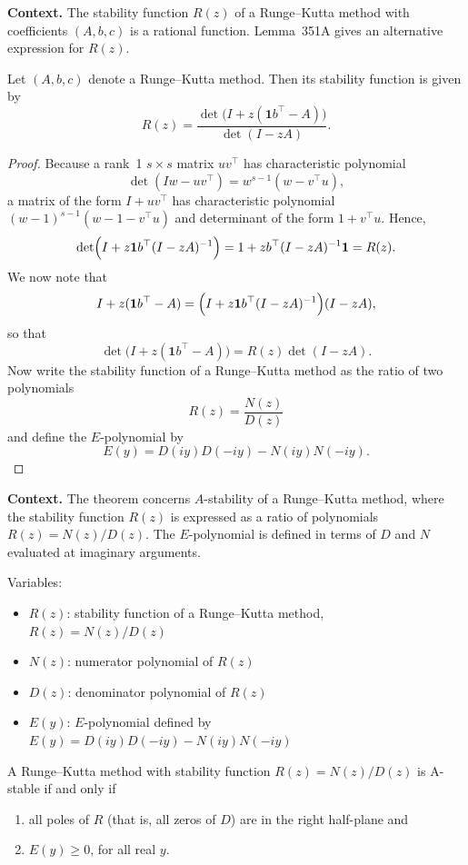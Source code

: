 \noindent\textbf{Context.}
The stability function \(R(z)\) of a Runge--Kutta method with coefficients \((A,b,c)\) is a rational function.  Lemma~351A gives an alternative expression for \(R(z)\).

\begin{lemma}

  \label{lem:351A}
Let $(A, b, c)$ denote a Runge--Kutta method. Then its stability function is given by
\[
R(z) = \frac{\det\bigl(I + z(\mathbf{1}b^{\top} - A)\bigr)}{\det(I - zA)}.
\]
\end{lemma}

\begin{proof}
Because a rank~1 $s \times s$ matrix $uv^{\top}$ has characteristic polynomial
\[
\det(I w - uv^{\top}) = w^{s-1}(w - v^{\top}u),
\]
a matrix of the form $I + uv^{\top}$ has characteristic polynomial $(w-1)^{s-1}(w-1-v^{\top}u)$ and determinant of the form $1+v^{\top}u$. Hence,
\[
\det\Bigl(I + z\mathbf{1}b^{\top}(I - zA)^{-1}\Bigr) = 1 + zb^{\top}(I - zA)^{-1}\mathbf{1} = R(z).
\]
We now note that
\[
I + z(\mathbf{1}b^{\top} - A) = \Bigl(I + z\mathbf{1}b^{\top}(I - zA)^{-1}\Bigr)(I - zA),
\]
so that
\[
\det\bigl(I + z(\mathbf{1}b^{\top} - A)\bigr) = R(z) \det(I - zA).
\]
Now write the stability function of a Runge--Kutta method as the ratio of two polynomials
\[
R(z) = \frac{N(z)}{D(z)}
\]
and define the $E$-polynomial by
\[
E(y) = D(iy)D(-iy) - N(iy)N(-iy).
\]
\end{proof}

\noindent\textbf{Context.}
The theorem concerns $A$-stability of a Runge--Kutta method, where the stability function $R(z)$ is expressed as a ratio of polynomials $R(z)=N(z)/D(z)$. The $E$-polynomial is defined in terms of $D$ and $N$ evaluated at imaginary arguments.

Variables:
\begin{itemize}
    \item $R(z)$: stability function of a Runge--Kutta method, $R(z)=N(z)/D(z)$
    \item $N(z)$: numerator polynomial of $R(z)$
    \item $D(z)$: denominator polynomial of $R(z)$
    \item $E(y)$: $E$-polynomial defined by $E(y)=D(iy)D(-iy)-N(iy)N(-iy)$
\end{itemize}

\begin{theorem}

  \label{thm:351B}
  \uses{}
A Runge--Kutta method with stability function $R(z) = N(z)/D(z)$ is A-stable if and only if
\begin{enumerate}
    \item[(a)] all poles of $R$ (that is, all zeros of $D$) are in the right half-plane and
    \item[(b)] $E(y) \geq 0$, for all real $y$.
\end{enumerate}
\end{theorem}

